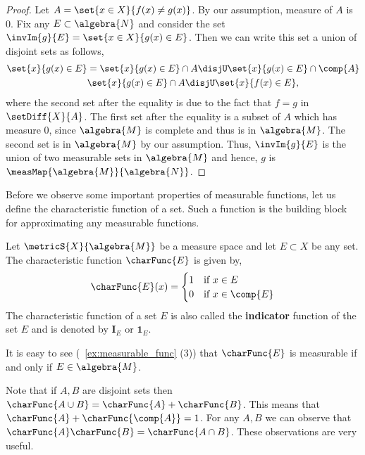 \begin{proof}
    Let $A = \set{x \in X}{f(x)\neq g(x)}$. By our assumption, measure of $A$ is $0$. Fix any $E \subset
    \algebra{N}$ and consider the set
    $\invIm{g}{E} = \set{x\in X}{g(x) \in E}$. Then we can write this set a union of disjoint sets as follows,
    \begin{align*}
	\set{x}{g(x) \in E} &= \set{x}{g(x) \in E}\cap A \disjU \set{x}{g(x) \in E}\cap
	\comp{A} \\
	&\set{x}{g(x) \in E}\cap A \disjU \set{x}{f(x) \in E}, 
    \end{align*}
    where the second set after the equality is due to the fact that $f=g$ in $\setDiff{X}{A}$. The first set
    after the equality is a subset of $A$ which has measure $0$, since $\algebra{M}$ is complete and thus is
    in $\algebra{M}$. The second set is in $\algebra{M}$ by our assumption. Thus, $\invIm{g}{E}$ is the union
    of two measurable sets in $\algebra{M}$ and hence, $g$ is $\measMap{\algebra{M}}{\algebra{N}}$.
\end{proof}
Before we observe some important properties of measurable functions, let us define the characteristic function
of a set. Such a function is the building block for approximating any measurable functions. 
\begin{Definition}[name=Characteristic function]
    Let $\metricS{X}{\algebra{M}}$ be a measure space and let $E \subset X$ be any set. The characteristic
    function $\charFunc{E}$ is given by,
    \begin{equation}\label{eq:char_func}
	\charFunc{E}(x) = 
	\begin{cases}
	    1 &\text{if $x\in E$}\\
	    0 &\text{if $x\in \comp{E}$}\\
	\end{cases}
    \end{equation}
    The characteristic function of a set $E$ is also called the \textbf{indicator} function of the set $E$ and
    is denoted by $\boldsymbol{I}_{E}$ or $\boldsymbol{1}_{E}$.
\end{Definition}
It is easy to see (~\ref{ex:measurable_func} (3)) that $\charFunc{E}$ is measurable if and only if $E \in
\algebra{M}$. 
\begin{Remark}
    Note that if $A,B$ are disjoint sets then $\charFunc{A\cup B} = \charFunc{A} + \charFunc{B}$. This means
    that $\charFunc{A} + \charFunc{\comp{A}} = 1$. For any
    $A,B$ we can observe that $\charFunc{A}\charFunc{B} = \charFunc{A\cap B}$. These observations are very
    useful.
\end{Remark}
